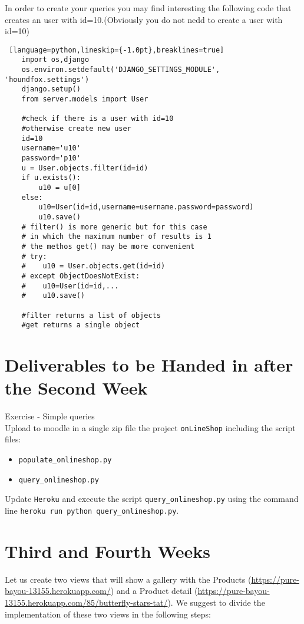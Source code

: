 \documentclass[12pt]{article} %
\newcounter{ejercicioNo}
\newcommand{\herokuurl}[1]{\url{https://pure-bayou-13155.herokuapp.com/#1}}%
\newcommand{\proyecto}{\texttt{onlineshop}}%
\newcommand{\heroku}{\texttt{Heroku}}
\newcommand{\populatescript}{\texttt{populate\_\proyecto.py}}
\begin{document}
In order to create your queries you may find interesting the following code that creates an user with id=10.(Obviously you do not nedd to create a user with id=10)
\begin{lstlisting} [language=python,lineskip={-1.0pt},breaklines=true]
    import os,django
    os.environ.setdefault('DJANGO_SETTINGS_MODULE', 'houndfox.settings')
    django.setup()
    from server.models import User
    
    #check if there is a user with id=10
    #otherwise create new user
    id=10
    username='u10'
    password='p10'
    u = User.objects.filter(id=id) 
    if u.exists():
        u10 = u[0]
    else:
        u10=User(id=id,username=username.password=password)
        u10.save()
    # filter() is more generic but for this case
    # in which the maximum number of results is 1
    # the methos get() may be more convenient
    # try:
    #    u10 = User.objects.get(id=id)
    # except ObjectDoesNotExist:
    #    u10=User(id=id,...
    #    u10.save()
    
    #filter returns a list of objects
    #get returns a single object
\end{lstlisting}

\section{Deliverables to be Handed in after the Second Week}

\begin{minipage}{\linewidth}
\begin{framed}
\addtocounter{ejercicioNo}{1} 
Exercise  - Simple queries\\
Upload to  moodle in a single zip file the project \texttt{onLineShop} including the script files:
 \begin{itemize}
   \item \populatescript 
   \item \texttt{query\_onlineshop.py} 
 \end{itemize}
 Update \heroku{} and execute the script \texttt{query\_onlineshop.py} using the command line \texttt{heroku run python query\_onlineshop.py}. 

\end{framed}
\end{minipage}

\section{Third and Fourth Weeks} %
Let us create two views that will show a gallery with the Products (\herokuurl{}) and a Product detail (\herokuurl{85/butterfly-stars-tat/}). We suggest to divide the implementation of these two views in the following steps:
\end{document}
